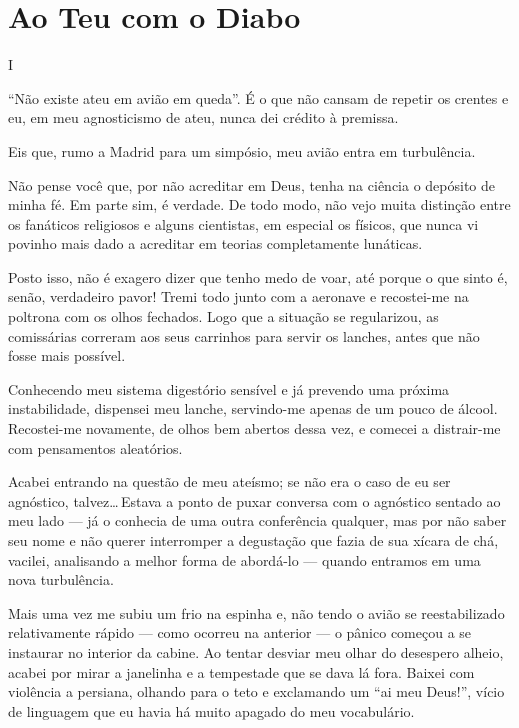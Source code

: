 \chapter{Ao Teu com o Diabo}


\begin{center}
{\Large I}
\end{center}

``Não existe ateu em avião em queda''. É o que não cansam de repetir os crentes e eu, em meu agnosticismo de ateu, nunca dei crédito à premissa.

Eis que, rumo a Madrid para um simpósio, meu avião entra em turbulência.

Não pense você que, por não acreditar em Deus, tenha na ciência o depósito de minha fé. Em parte sim, é verdade. De todo modo, não vejo muita distinção entre os fanáticos religiosos e alguns cientistas, em especial os físicos, que nunca vi povinho mais dado a acreditar em teorias completamente lunáticas.

Posto isso, não é exagero dizer que tenho medo de voar, até porque o que sinto é, senão, verdadeiro pavor! Tremi todo junto com a aeronave e recostei-me na poltrona com os olhos fechados. Logo que a situação se regularizou, as comissárias correram aos seus carrinhos para servir os lanches, antes que não fosse mais possível.

Conhecendo meu sistema digestório sensível e já prevendo uma próxima instabilidade, dispensei meu lanche, servindo-me apenas de um pouco de álcool. Recostei-me novamente, de olhos bem abertos dessa vez, e comecei a distrair-me com pensamentos aleatórios.

Acabei entrando na questão de meu ateísmo; se não era o caso de eu ser agnóstico, talvez\ldots\,Estava a ponto de puxar conversa com o agnóstico sentado ao meu lado --- já o conhecia de uma outra conferência qualquer, mas por não saber seu nome e não querer interromper a degustação que fazia de sua xícara de chá, vacilei, analisando a melhor forma de abordá-lo --- quando entramos em uma nova turbulência.

Mais uma vez me subiu um frio na espinha e, não tendo o avião se reestabilizado relativamente rápido --- como ocorreu na anterior --- o pânico começou a se instaurar no interior da cabine. Ao tentar desviar meu olhar do desespero alheio, acabei por mirar a janelinha e a tempestade que se dava lá fora. Baixei com violência a persiana, olhando para o teto e exclamando um ``ai meu Deus!'', vício de linguagem que eu havia há muito apagado do meu vocabulário.

